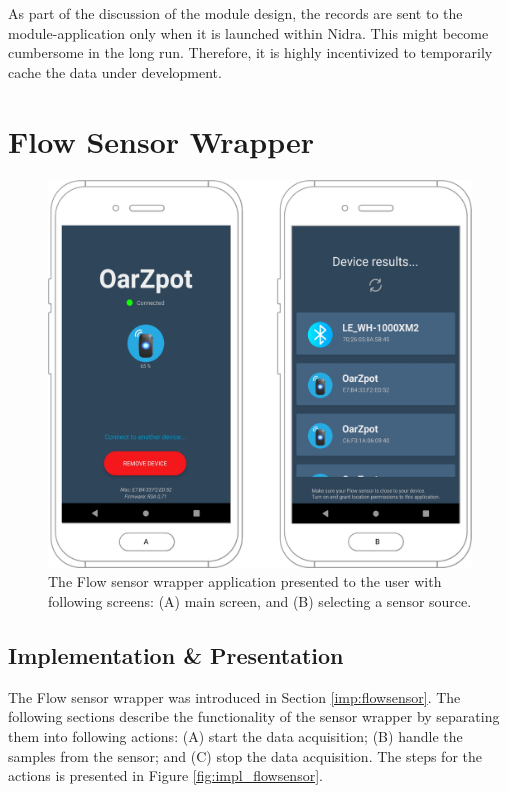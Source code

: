 As part of the discussion of the module design, the records are sent to the module-application only when it is launched within Nidra. This might become cumbersome in the long run. Therefore, it is highly incentivized to temporarily cache the data under development. 


\chapter{Flow Sensor Wrapper}

\begin{figure}[!h]
    \centering
    \includegraphics[scale=0.25]{images/flow_app.pdf}
    \caption{The Flow sensor wrapper application presented to the user with following screens: (A) main screen, and (B) selecting a sensor source.}
    \label{fig:flowapp}
\end{figure}



\section{Implementation \& Presentation}

The Flow sensor wrapper was introduced in Section \ref{imp:flowsensor}. The following sections describe the functionality of the sensor wrapper by separating them into following actions: (A) start the data acquisition; (B) handle the samples from the sensor; and (C) stop the data acquisition. The steps for the actions is presented in Figure \ref{fig:impl_flowsensor}.

